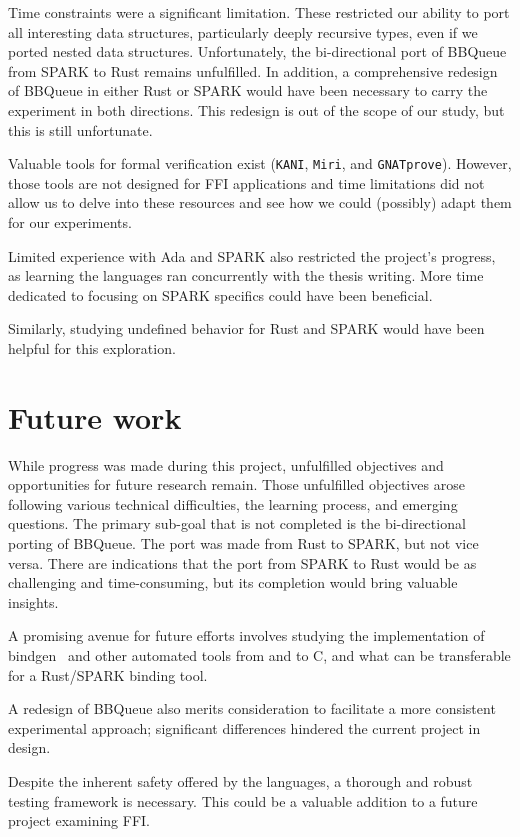 \documentclass[nomenclature, english, bibtex]{kththesis}
\begin{document}
{Time constraints were a significant limitation. These restricted our ability to port all interesting data structures, particularly deeply recursive types, even if we ported nested data structures. Unfortunately, the bi-directional port of BBQueue from SPARK to Rust remains unfulfilled. In addition, a comprehensive redesign of BBQueue in either Rust or SPARK would have been necessary to carry the experiment in both directions. This redesign is out of the scope of our study, but this is still unfortunate. 

Valuable tools for formal verification exist (\texttt{KANI}, \texttt{Miri}, and \texttt{GNATprove}). However, those tools are not designed for FFI applications and time limitations did not allow us to delve into these resources and see how we could (possibly) adapt them for our experiments.

Limited experience with Ada and SPARK also restricted the project's progress, as learning the languages ran concurrently with the thesis writing. More time dedicated to focusing on SPARK specifics could have been beneficial.

Similarly, studying undefined behavior for Rust and SPARK would have been helpful for this exploration.

\section{Future work}
\label{sec:futureWork}

While progress was made during this project, unfulfilled objectives and opportunities for future research remain. Those unfulfilled objectives arose following various technical difficulties, the learning process, and emerging questions. 
The primary sub-goal that is not completed is the bi-directional porting of BBQueue. The port was made from Rust to SPARK, but not vice versa. There are indications that the port from SPARK to Rust would be as challenging and time-consuming, but its completion would bring valuable insights.

A promising avenue for future efforts involves studying the implementation of bindgen~\cite{noauthor_bindgen_2022} and other automated tools from and to C, and what can be transferable for a Rust/SPARK binding tool.

A redesign of BBQueue also merits consideration to facilitate a more consistent experimental approach; significant differences hindered the current project in design.

Despite the inherent safety offered by the languages, a thorough and robust testing framework is necessary. This could be a valuable addition to a future project examining FFI.

}
\end{document}
